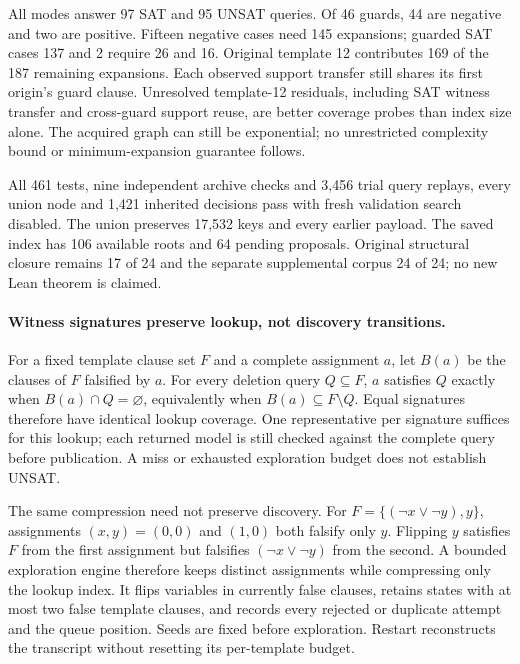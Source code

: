 \documentclass[11pt,a4paper]{article}
\numberwithin{equation}{section}
\theoremstyle{plain}
\theoremstyle{definition}
\theoremstyle{remark}
\begin{document}
All modes answer 97 SAT and 95 UNSAT queries. Of 46 guards, 44 are negative
and two are positive. Fifteen negative cases need 145 expansions; guarded SAT
cases 137 and 2 require 26 and 16. Original template 12 contributes 169 of the
187 remaining expansions. Each observed support transfer still shares its
first origin's guard clause. Unresolved template-12 residuals, including SAT
witness transfer and cross-guard support reuse, are better coverage probes than
index size alone. The acquired graph can still be exponential; no unrestricted
complexity bound or minimum-expansion guarantee follows.

All 461 tests, nine independent archive checks and 3,456 trial query replays,
every union node and 1,421 inherited decisions pass with fresh validation search
disabled. The union preserves 17,532 keys and every earlier payload. The saved
index has 106 available roots and 64 pending proposals. Original structural
closure remains 17 of 24 and the separate supplemental corpus 24 of 24;
no new Lean theorem is claimed.

\paragraph{Witness signatures preserve lookup, not discovery transitions.}
For a fixed template clause set $F$ and a complete assignment $a$, let $B(a)$
be the clauses of $F$ falsified by $a$. For every deletion query $Q\subseteq F$,
$a$ satisfies $Q$ exactly when $B(a)\cap Q=\varnothing$, equivalently when
$B(a)\subseteq F\setminus Q$. Equal signatures therefore have identical lookup
coverage. One representative per signature suffices for this lookup; each
returned model is still checked against the complete query before publication.
A miss or exhausted exploration budget does not establish UNSAT.

The same compression need not preserve discovery. For
$F=\{(\neg x\lor\neg y),y\}$, assignments $(x,y)=(0,0)$ and $(1,0)$ both
falsify only $y$. Flipping $y$ satisfies $F$ from the first assignment but
falsifies $(\neg x\lor\neg y)$ from the second. A bounded exploration engine
therefore keeps distinct assignments while compressing only the lookup index.
It flips variables in currently false clauses, retains states with at most two
false template clauses, and records every rejected or duplicate attempt and
the queue position. Seeds are fixed before exploration. Restart reconstructs
the transcript without resetting its per-template budget.
\end{document}
